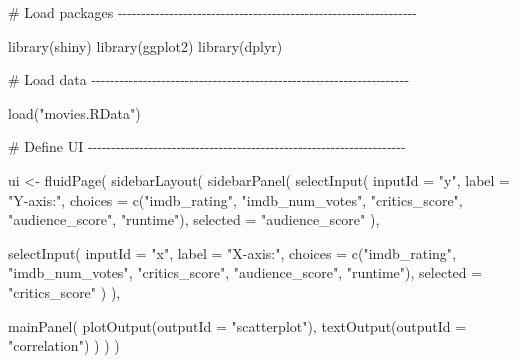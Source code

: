 \documentclass[
  letterpaper,
  DIV=11,
  numbers=noendperiod]{scrreprt}
\newenvironment{Shaded}{\begin{snugshade}}{\end{snugshade}}
\newcommand{\AttributeTok}[1]{\textcolor[rgb]{0.40,0.46,0.14}{#1}}
\newcommand{\CommentTok}[1]{\textcolor[rgb]{0.37,0.37,0.37}{#1}}
\newcommand{\FunctionTok}[1]{\textcolor[rgb]{0.28,0.35,0.67}{#1}}
\newcommand{\NormalTok}[1]{\textcolor[rgb]{0.00,0.46,0.62}{#1}}
\newcommand{\OtherTok}[1]{\textcolor[rgb]{0.00,0.46,0.62}{#1}}
\newcommand{\StringTok}[1]{\textcolor[rgb]{0.13,0.47,0.30}{#1}}
\begin{document}
\begin{Shaded}
\begin{Highlighting}[]
\CommentTok{\# Load packages {-}{-}{-}{-}{-}{-}{-}{-}{-}{-}{-}{-}{-}{-}{-}{-}{-}{-}{-}{-}{-}{-}{-}{-}{-}{-}{-}{-}{-}{-}{-}{-}{-}{-}{-}{-}{-}{-}{-}{-}{-}{-}{-}{-}{-}{-}{-}{-}{-}{-}{-}{-}{-}{-}{-}{-}{-}{-}{-}{-}{-}{-}{-}{-}}

\FunctionTok{library}\NormalTok{(shiny)}
\FunctionTok{library}\NormalTok{(ggplot2)}
\FunctionTok{library}\NormalTok{(dplyr)}

\CommentTok{\# Load data {-}{-}{-}{-}{-}{-}{-}{-}{-}{-}{-}{-}{-}{-}{-}{-}{-}{-}{-}{-}{-}{-}{-}{-}{-}{-}{-}{-}{-}{-}{-}{-}{-}{-}{-}{-}{-}{-}{-}{-}{-}{-}{-}{-}{-}{-}{-}{-}{-}{-}{-}{-}{-}{-}{-}{-}{-}{-}{-}{-}{-}{-}{-}{-}{-}{-}{-}{-}}

\FunctionTok{load}\NormalTok{(}\StringTok{"movies.RData"}\NormalTok{)}

\CommentTok{\# Define UI {-}{-}{-}{-}{-}{-}{-}{-}{-}{-}{-}{-}{-}{-}{-}{-}{-}{-}{-}{-}{-}{-}{-}{-}{-}{-}{-}{-}{-}{-}{-}{-}{-}{-}{-}{-}{-}{-}{-}{-}{-}{-}{-}{-}{-}{-}{-}{-}{-}{-}{-}{-}{-}{-}{-}{-}{-}{-}{-}{-}{-}{-}{-}{-}{-}{-}{-}{-}}

\NormalTok{ui }\OtherTok{\textless{}{-}} \FunctionTok{fluidPage}\NormalTok{(}
  \FunctionTok{sidebarLayout}\NormalTok{(}
    \FunctionTok{sidebarPanel}\NormalTok{(}
      \FunctionTok{selectInput}\NormalTok{(}
        \AttributeTok{inputId =} \StringTok{"y"}\NormalTok{,}
        \AttributeTok{label =} \StringTok{"Y{-}axis:"}\NormalTok{,}
        \AttributeTok{choices =} \FunctionTok{c}\NormalTok{(}\StringTok{"imdb\_rating"}\NormalTok{, }\StringTok{"imdb\_num\_votes"}\NormalTok{, }\StringTok{"critics\_score"}\NormalTok{, }\StringTok{"audience\_score"}\NormalTok{, }\StringTok{"runtime"}\NormalTok{),}
        \AttributeTok{selected =} \StringTok{"audience\_score"}
\NormalTok{      ),}

      \FunctionTok{selectInput}\NormalTok{(}
        \AttributeTok{inputId =} \StringTok{"x"}\NormalTok{,}
        \AttributeTok{label =} \StringTok{"X{-}axis:"}\NormalTok{,}
        \AttributeTok{choices =} \FunctionTok{c}\NormalTok{(}\StringTok{"imdb\_rating"}\NormalTok{, }\StringTok{"imdb\_num\_votes"}\NormalTok{, }\StringTok{"critics\_score"}\NormalTok{, }\StringTok{"audience\_score"}\NormalTok{, }\StringTok{"runtime"}\NormalTok{),}
        \AttributeTok{selected =} \StringTok{"critics\_score"}
\NormalTok{      )}
\NormalTok{    ),}

    \FunctionTok{mainPanel}\NormalTok{(}
      \FunctionTok{plotOutput}\NormalTok{(}\AttributeTok{outputId =} \StringTok{"scatterplot"}\NormalTok{),}
      \FunctionTok{textOutput}\NormalTok{(}\AttributeTok{outputId =} \StringTok{"correlation"}\NormalTok{)}
\NormalTok{    )}
\NormalTok{  )}
\NormalTok{)}


\end{Highlighting}
\end{Shaded}
\end{document}
